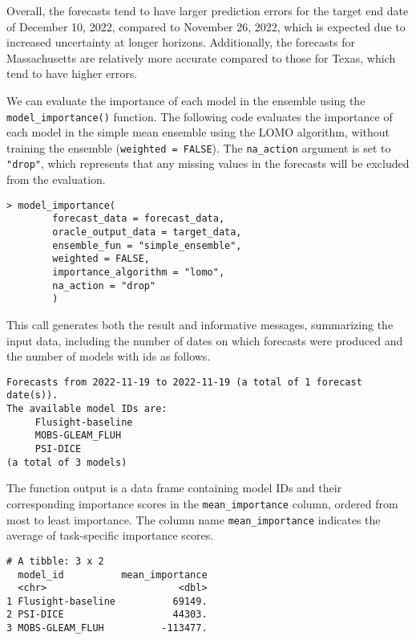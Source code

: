 \documentclass[
  article,
  shortnames,
  notitle]{jss}
\begin{document}
Overall, the forecasts tend to have larger prediction errors for the
target end date of December 10, 2022, compared to November 26, 2022,
which is expected due to increased uncertainty at longer horizons.
Additionally, the forecasts for Massachusetts are relatively more
accurate compared to those for Texas, which tend to have higher errors.

\normalsize

We can evaluate the importance of each model in the ensemble using the
\texttt{model\_importance()} function. The following code evaluates the
importance of each model in the simple mean ensemble using the LOMO
algorithm, without training the ensemble (\texttt{weighted\ =\ FALSE}).
The \texttt{na\_action} argument is set to \texttt{"drop"}, which
represents that any missing values in the forecasts will be excluded
from the evaluation.

\begin{verbatim}
> model_importance(
        forecast_data = forecast_data, 
        oracle_output_data = target_data,
        ensemble_fun = "simple_ensemble", 
        weighted = FALSE,
        importance_algorithm = "lomo", 
        na_action = "drop"
        )
\end{verbatim}

This call generates both the result and informative messages,
summarizing the input data, including the number of dates on which
forecasts were produced and the number of models with ids as follows.

\small

\begin{verbatim}
Forecasts from 2022-11-19 to 2022-11-19 (a total of 1 forecast date(s)).
The available model IDs are:
     Flusight-baseline
     MOBS-GLEAM_FLUH
     PSI-DICE 
(a total of 3 models)
\end{verbatim}

\normalsize

The function output is a data frame containing model IDs and their
corresponding importance scores in the \texttt{mean\_importance} column,
ordered from most to least importance. The column name
\texttt{mean\_importance} indicates the average of task-specific
importance scores.

\small

\begin{verbatim}
# A tibble: 3 x 2
  model_id          mean_importance
  <chr>                       <dbl>
1 Flusight-baseline          69149.
2 PSI-DICE                   44303.
3 MOBS-GLEAM_FLUH          -113477.
\end{verbatim}
\end{document}
